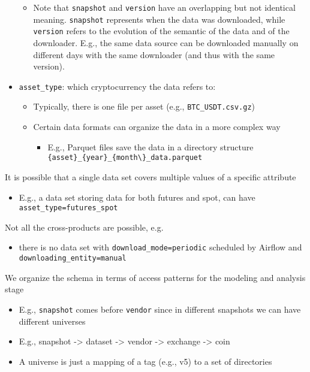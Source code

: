\documentclass[11pt, reqno]{amsart}
\theoremstyle{definition}
\theoremstyle{remark}
\begin{document}
\begin{itemize}
\begin{itemize}
        \item Note that \verb|snapshot| and \verb|version| have an overlapping but
          not identical meaning. \verb|snapshot| represents when the data was
          downloaded, while \verb|version| refers to the evolution of the semantic
          of the data and of the downloader. E.g., the same data source can be
          downloaded manually on different days with the same downloader (and thus
          with the same version).
      \end{itemize}

    \item \verb|asset_type|: which cryptocurrency the data refers to:

      \begin{itemize}
        \item Typically, there is one file per asset (e.g., \verb|BTC_USDT.csv.gz|)

        \item Certain data formats can organize the data in a more complex way

          \begin{itemize}
            \item E.g., Parquet files save the data in a directory structure \verb|{asset}_{year}_{month\}_data.parquet|
          \end{itemize}
      \end{itemize}
  \end{itemize}

  It is possible that a single data set covers multiple values of a specific
  attribute

  \begin{itemize}
    \item E.g., a data set storing data for both futures and spot, can have
      \verb|asset_type=futures_spot|
  \end{itemize}

  Not all the cross-products are possible, e.g.

  \begin{itemize}
    \item there is no data set with \verb|download_mode=periodic| scheduled by Airflow
      and \verb|downloading_entity=manual|
  \end{itemize}

  We organize the schema in terms of access patterns for the modeling and
  analysis stage

  \begin{itemize}
    \item E.g., \verb|snapshot| comes before \verb|vendor| since in different snapshots
      we can have different universes

    \item E.g., snapshot -\textgreater{} dataset -\textgreater{} vendor -\textgreater{}
      exchange -\textgreater{} coin

    \item A universe is just a mapping of a tag (e.g., v5) to a set of directories
  \end{itemize}
\end{document}
